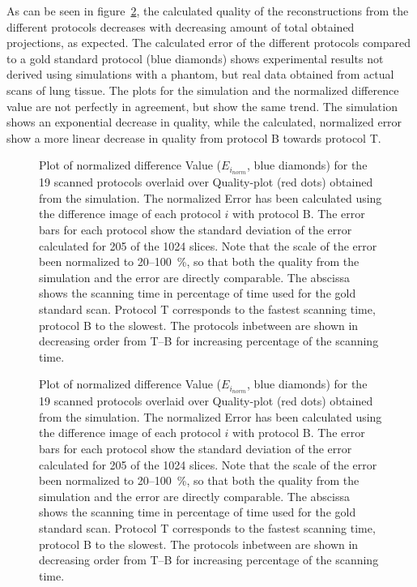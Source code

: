 As can be seen in figure~\ref{fig:NormalizedErrorPlot}, the calculated quality of the reconstructions from the different protocols decreases with decreasing amount of total obtained projections, as expected. The calculated error of the different protocols compared to a gold standard protocol (blue diamonds) shows experimental results not derived using simulations with a phantom, but real data obtained from actual scans of lung tissue. The plots for the simulation and the normalized difference value are not perfectly in agreement, but show the same trend. The simulation shows an exponential decrease in quality, while the calculated, normalized error show a more linear decrease in quality from protocol B towards protocol T.

\ifiucr
	\begin{figure}%
		\centering%
		\caption{%
			Plot of normalized difference Value ($E_{i_{norm}}$, blue diamonds) for the 19 scanned protocols overlaid over Quality-plot (red dots) obtained from the simulation. The normalized Error has been calculated using the difference image of each protocol $i$ with protocol B. The error bars for each protocol show the standard deviation of the error calculated for 205 of the 1024 slices. Note that the scale of the error been normalized to 20--\SI{100}{\percent}, so that both the quality from the simulation and the error are directly comparable. The abscissa shows the scanning time in percentage of time used for the gold standard scan. Protocol T corresponds to the fastest scanning time, protocol B to the slowest. The protocols inbetween are shown in decreasing order from T--B for increasing percentage of the scanning time.%
		}%
		\label{fig:NormalizedErrorPlot}%
	\end{figure}%
\else
	\begin{figure}[htp]
		\centering
		
	\caption{%
		Plot of normalized difference Value ($E_{i_{norm}}$, blue diamonds) for the 19 scanned protocols overlaid over Quality-plot (red dots) obtained from the simulation. The normalized Error has been calculated using the difference image of each protocol $i$ with protocol B. The error bars for each protocol show the standard deviation of the error calculated for 205 of the 1024 slices. Note that the scale of the error been normalized to 20--\SI{100}{\percent}, so that both the quality from the simulation and the error are directly comparable. The abscissa shows the scanning time in percentage of time used for the gold standard scan. Protocol T corresponds to the fastest scanning time, protocol B to the slowest. The protocols inbetween are shown in decreasing order from T--B for increasing percentage of the scanning time.%
		}%
		\label{fig:NormalizedErrorPlot}
	\end{figure}
\fi

